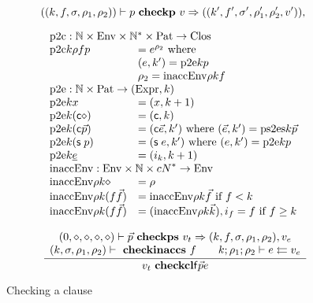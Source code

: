 \[
((k,f,\sigma,\rho_1,\rho_2))\vdash p\mbox{ \textbf{checkp} }v\Rightarrow ((k',f',\sigma',\rho'_1,\rho'_2,v')),\]

\[
\begin{array}{ll}
\multicolumn{2}{l}{\ptc : \cN \times \Env \times \ves{\cN} \times \Pat \ra \Clos}\\
\ptc k \rho f p & = \cl{e}{\rho_2} \mbox{ where } \\
& (e,k') = \pte k p \\
& \rho_2 = \inaccenv \rho k f \\
\multicolumn{2}{l}{\pte : \cN \times \Pat \ra (\Expr,k)}\\
\pte k x & = (x,k+1) \\
\pte k (\cc \diamond) & = (\cc,k) \\
\pte k (\cc \vec{p}) & = (\cc \vec{e},k') \mbox{ where } (\vec{e},k') = \pstes k \vec{p}\\
\pte k (\s p) & = (\s e,k') \mbox{ where } (e,k') = \pte k p\\
\pte k \inacc{e} & = (i_k,k+1) \\
\multicolumn{2}{l}{\inaccenv : \Env \times \cN \times \ves{cN} \ra \Env}\\
\inaccenv \rho k \diamond & = \rho \\
\inaccenv \rho k (f \vec{f}) & = \inaccenv \rho k \vec{f} \mbox{ if } f < k  \\
\inaccenv \rho k (f \vec{f}) & = \ins{(\inaccenv \rho k \vec{k})}{i_f}{f} \mbox { if } f \geq k 
\end{array}
\]

\begin{figure}
\begin{gather*}
\ \dfrac{\begin{array}[b]{c}(0,\diamond,\diamond,\diamond,\diamond)\vdash\vec{p}\mbox{ \textbf{checkps} }v_t\Rightarrow (k,f,\sigma,\rho_1,\rho_2),v_e\\(k,\sigma,\rho_1,\rho_2)\vdash\mbox{ \textbf{checkinaccs} }f 
\qquad
k;\rho_1;\rho_2\vdash e\leftleftarrows v_e
\end{array}}{
v_t\mbox{ \textbf{checkcl}}\mathsf{f} \vec{p} e
}
\end{gather*}
\caption{Checking a clause}
\end{figure}

